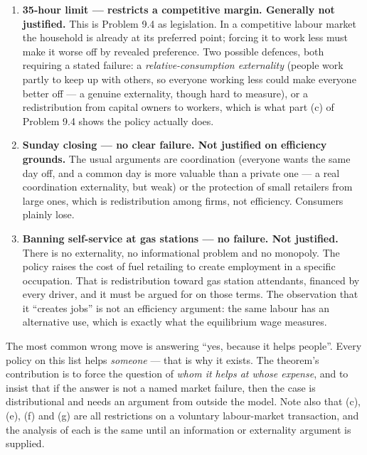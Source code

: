 \documentclass[12pt, letterpaper]{article}
\begin{document}
\begin{tcolorbox}[oddbox,title={Problem 9.1 \quad The First Welfare Theorem}]
\begin{enumerate}
\item \textbf{35-hour limit --- restricts a competitive margin. Generally not justified.} This
is Problem 9.4 as legislation. In a competitive labour market the household is already at its
preferred point; forcing it to work less must make it worse off by revealed preference. Two
possible defences, both requiring a stated failure: a \emph{relative-consumption externality}
(people work partly to keep up with others, so everyone working less could make everyone
better off --- a genuine externality, though hard to measure), or a redistribution from capital
owners to workers, which is what part (c) of Problem 9.4 shows the policy actually does.

\item \textbf{Sunday closing --- no clear failure. Not justified on efficiency grounds.} The
usual arguments are coordination (everyone wants the same day off, and a common day is more
valuable than a private one --- a real coordination externality, but weak) or the protection of
small retailers from large ones, which is redistribution among firms, not efficiency.
Consumers plainly lose.

\item \textbf{Banning self-service at gas stations --- no failure. Not justified.} There is no
externality, no informational problem and no monopoly. The policy raises the cost of fuel
retailing to create employment in a specific occupation. That is redistribution toward gas
station attendants, financed by every driver, and it must be argued for on those terms. The
observation that it ``creates jobs'' is not an efficiency argument: the same labour has an
alternative use, which is exactly what the equilibrium wage measures.
\end{enumerate}

\begin{tcolorbox}[trapbox]
The most common wrong move is answering ``yes, because it helps people''. Every policy on this
list helps \emph{someone} --- that is why it exists. The theorem's contribution is to force the
question of \emph{whom it helps at whose expense}, and to insist that if the answer is not a
named market failure, then the case is distributional and needs an argument from outside the
model. Note also that (c), (e), (f) and (g) are all restrictions on a voluntary labour-market
transaction, and the analysis of each is the same until an information or externality argument
is supplied.
\end{tcolorbox}
\end{tcolorbox}
\end{document}
